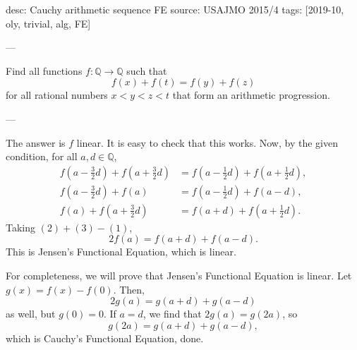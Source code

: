 desc: Cauchy arithmetic sequence FE
source: USAJMO 2015/4
tags: [2019-10, oly, trivial, alg, FE]

---

Find all functions $f:\mathbb Q\to\mathbb Q$ such that \[f(x)+f(t)=f(y)+f(z)\]
for all rational numbers $x<y<z<t$ that form an arithmetic progression.

---

The answer is $f$ linear. It is easy to check that this works. Now, by the given condition, for all $a,d\in\mathbb Q$,
\begin{align}
f\left(a-\frac32d\right)+f\left(a+\frac32d\right)&=f\left(a-\frac12d\right)+f\left(a+\frac12d\right),\\
f\left(a-\frac32d\right)+f(a)&=f\left(a-\frac12d\right)+f(a-d),\\
f(a)+f\left(a+\frac32d\right)&=f(a+d)+f\left(a+\frac12d\right).
\end{align}
Taking $(2)+(3)-(1)$, \[2f(a)=f(a+d)+f(a-d).\]
This is Jensen's Functional Equation, which is linear.

For completeness, we will prove that Jensen's Functional Equation is linear. Let $g(x)=f(x)-f(0)$. Then, \[2g(a)=g(a+d)+g(a-d)\]
as well, but $g(0)=0$. If $a=d$, we find that $2g(a)=g(2a)$, so \[g(2a)=g(a+d)+g(a-d),\]
which is Cauchy's Functional Equation, done.
